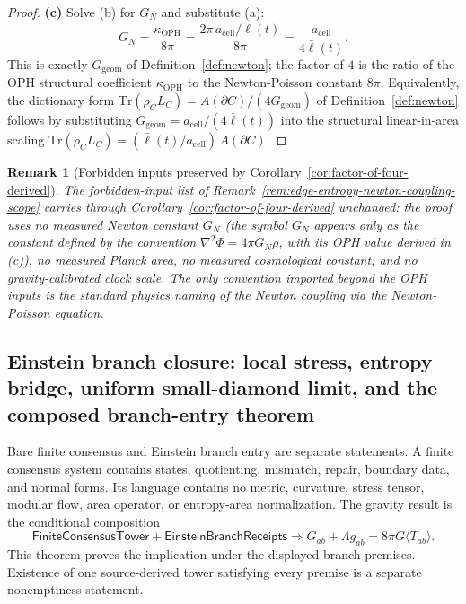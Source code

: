 \documentclass[11pt]{article}
\newtheorem{remark}[theorem]{Remark}
\begin{document}
\begin{proof}
\textbf{(c)} Solve (b) for \(G_N\) and substitute (a):
\[
G_N=\frac{\kappa_{\mathrm{OPH}}}{8\pi}=\frac{2\pi\,a_{\mathrm{cell}}/\bar\ell(t)}{8\pi}=\frac{a_{\mathrm{cell}}}{4\bar\ell(t)}.
\]
This is exactly \(G_{\mathrm{geom}}\) of Definition~\ref{def:newton}; the factor of \(4\) is the ratio of the OPH structural coefficient \(\kappa_{\mathrm{OPH}}\) to the Newton-Poisson constant \(8\pi\). Equivalently, the dictionary form \(\mathrm{Tr}(\rho_C L_C)=A(\partial C)/(4G_{\mathrm{geom}})\) of Definition~\ref{def:newton} follows by substituting \(G_{\mathrm{geom}}=a_{\mathrm{cell}}/(4\bar\ell(t))\) into the structural linear-in-area scaling \(\mathrm{Tr}(\rho_C L_C)=(\bar\ell(t)/a_{\mathrm{cell}})\,A(\partial C)\).
\end{proof}

\begin{remark}[Forbidden inputs preserved by Corollary~\ref{cor:factor-of-four-derived}]\label{rem:factor-of-four-forbidden-inputs}
The forbidden-input list of Remark~\ref{rem:edge-entropy-newton-coupling-scope} carries through Corollary~\ref{cor:factor-of-four-derived} unchanged: the proof uses no measured Newton constant \(G_N\) (the symbol \(G_N\) appears only as the constant defined by the convention \(\nabla^2\Phi=4\pi G_N\rho\), with its OPH value derived in (c)), no measured Planck area, no measured cosmological constant, and no gravity-calibrated clock scale. The only convention imported beyond the OPH inputs is the standard physics naming of the Newton coupling via the Newton-Poisson equation.
\end{remark}

\subsection{Einstein branch closure: local stress, entropy bridge, uniform small-diamond limit, and the composed branch-entry theorem}
\label{subsec:einstein-branch-closure}

Bare finite consensus and Einstein branch entry are separate statements. A
finite consensus system contains states, quotienting, mismatch, repair,
boundary data, and normal forms. Its language contains no metric, curvature,
stress tensor, modular flow, area operator, or entropy-area normalization. The
gravity result is the conditional composition
\[
\mathsf{FiniteConsensusTower}
+\mathsf{EinsteinBranchReceipts}
\Longrightarrow
G_{ab}+\Lambda g_{ab}=8\pi G\langle T_{ab}\rangle .
\]
This theorem proves the implication under the displayed branch premises.
Existence of one source-derived tower satisfying every premise is a separate
nonemptiness statement.
\end{document}

